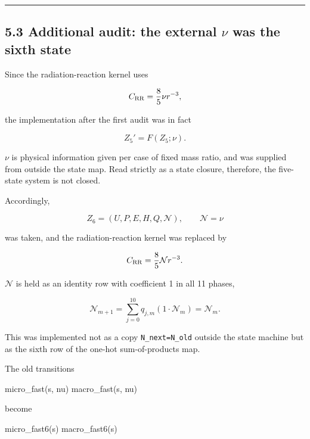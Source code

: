 \documentclass[
  a4paper,
]{article}
\newenvironment{Shaded}{}{}
\newcommand{\NormalTok}[1]{#1}
\begin{document}
\begin{center}\rule{0.5\linewidth}{0.5pt}\end{center}

\subsection{\texorpdfstring{5.3 Additional audit: the external \(\nu\)
was the sixth
state}{5.3 Additional audit: the external \textbackslash nu was the sixth state}}\label{additional-audit-the-external-nu-was-the-sixth-state}

Since the radiation-reaction kernel uses

\[
C_{\rm RR}=\frac85\nu r^{-3},
\]

the implementation after the first audit was in fact

\[
\boxed{Z_5'=F(Z_5;\nu)}.
\]

\(\nu\) is physical information given per case of fixed mass ratio, and
was supplied from outside the state map. Read strictly as a state
closure, therefore, the five-state system is not closed.

Accordingly,

\[
\boxed{
Z_6=(U,P,E,H,Q,\mathcal N),
\qquad
\mathcal N=\nu
}
\]

was taken, and the radiation-reaction kernel was replaced by

\[
C_{\rm RR}=\frac85\mathcal N r^{-3}.
\]

\(\mathcal N\) is held as an identity row with coefficient 1 in all 11
phases,

\[
\boxed{
\mathcal N_{m+1}
=
\sum_{j=0}^{10}q_{j,m}(1\cdot\mathcal N_m)
=
\mathcal N_m.
}
\]

This was implemented not as a copy \texttt{N\_next=N\_old} outside the
state machine but as the sixth row of the one-hot sum-of-products map.

The old transitions

\begin{Shaded}
\begin{Highlighting}[]
\NormalTok{micro\_fast(s, nu)}
\NormalTok{macro\_fast(s, nu)}
\end{Highlighting}
\end{Shaded}

become

\begin{Shaded}
\begin{Highlighting}[]
\NormalTok{micro\_fast6(s)}
\NormalTok{macro\_fast6(s)}
\end{Highlighting}
\end{Shaded}
\end{document}

